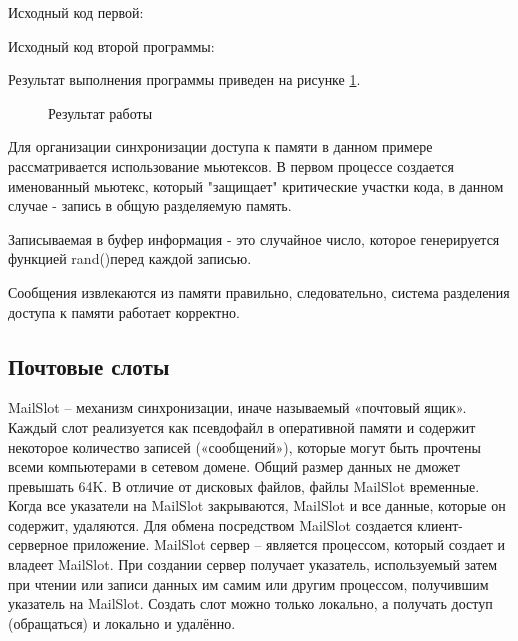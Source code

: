 \documentclass[a4paper]{article}
\begin{document}
	Исходный код первой:
	
	
	Исходный код второй программы:
	
	
	Результат выполнения программы приведен на рисунке \ref{img:task8}.
	\begin{figure}[h!]
		\caption{Результат работы}
		\label{img:task8}
	\end{figure}
	
	Для организации синхронизации доступа к памяти в данном примере рассматривается использование мьютексов. В первом процессе создается именованный мьютекс, который "защищает" критические участки кода, в данном случае - запись в общую разделяемую память.
	
	Записываемая в буфер информация - это случайное число, которое генерируется функцией rand()перед каждой записью.
	
	Сообщения извлекаются из памяти правильно, следовательно, система разделения доступа к памяти работает корректно.
	
\subsection{Почтовые слоты}
	MailSlot – механизм синхронизации, иначе называемый «почтовый ящик». Каждый слот реализуется как псевдофайл в оперативной памяти и содержит некоторое количество записей («сообщений»), которые могут быть прочтены всеми компьютерами в сетевом домене. Общий размер данных не дможет превышать 64K. В отличие от дисковых файлов, файлы MailSlot временные. Когда все указатели на MailSlot закрываются, MailSlot и все данные, которые он содержит, удаляются. Для обмена посредством MailSlot создается клиент-серверное приложение. MailSlot сервер – является процессом, который создает и владеет MailSlot. При создании сервер получает указатель, используемый затем при чтении или записи данных им самим или другим процессом, получившим указатель на MailSlot. Создать слот можно только локально, а получать доступ (обращаться) и локально и удалённо.
	
\end{document}
